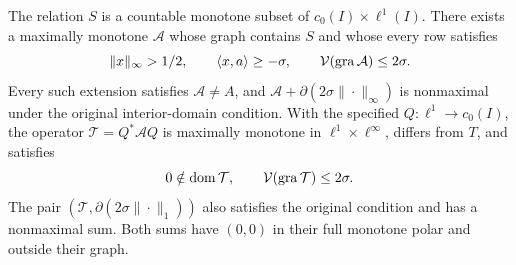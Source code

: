 \renewcommand{\thetheorem}{N}
\begin{theorem}
\label{thm:nonconstructive}
The relation $S$ is a countable monotone subset of
$c_0(I)\times\ell^1(I)$. There exists a maximally monotone
$\mathcal A$ whose graph contains $S$ and whose every row satisfies
\[
\|x\|_\infty>1/2,\qquad \langle x,a\rangle\ge-\sigma,
\qquad \mathcal V(\operatorname{gra}\mathcal A)\le2\sigma.
\]
Every such extension satisfies $\mathcal A\ne A$, and
$\mathcal A+\partial(2\sigma\|\cdot\|_\infty)$ is nonmaximal under
the original interior-domain condition.
With the specified $Q:\ell^1\to c_0(I)$, the operator
$\mathcal T=Q^*\mathcal A Q$ is maximally monotone in
$\ell^1\times\ell^\infty$, differs from $T$, and satisfies
\[
0\notin\operatorname{dom}\mathcal T,\qquad
\mathcal V(\operatorname{gra}\mathcal T)\le2\sigma.
\]
The pair $(\mathcal T,\partial(2\sigma\|\cdot\|_1))$ also satisfies
the original condition and has a nonmaximal sum. Both sums have
$(0,0)$ in their full monotone polar and outside their graph.
\end{theorem}
